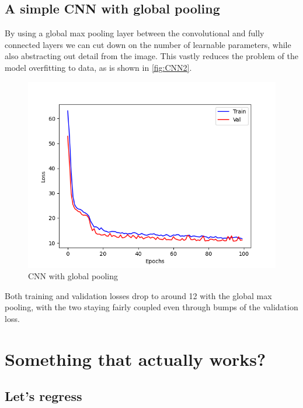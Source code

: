 \documentclass[sigconf]{acmart}
\begin{document}
\subsection{A simple CNN with global pooling}

By using a global max pooling layer between the convolutional and fully connected layers we can cut down on the number of learnable parameters, while also abstracting out detail from the image.
This vastly reduces the problem of the model overfitting to data, as is shown in \autoref{fig:CNN2}.
\begin{figure}[h]
    \includegraphics[scale=0.35]{../CNN2.png}
    \caption{CNN with global pooling}
    \label{fig:CNN2}
\end{figure}
Both training and validation losses drop to around 12 with the global max pooling, with the two staying fairly coupled even through bumps of the validation loss.
\section{Something that actually works?}
\subsection{Let's regress}
\end{document}
